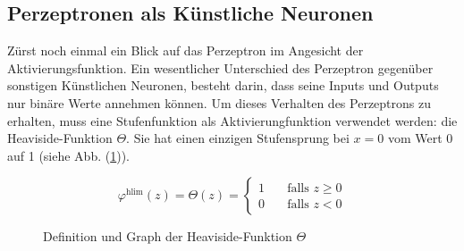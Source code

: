 \subsection{Perzeptronen als Künstliche Neuronen}
Zürst noch einmal ein Blick auf das Perzeptron im Angesicht der Aktivierungsfunktion.
Ein wesentlicher Unterschied des Perzeptron gegenüber sonstigen Künstlichen
Neuronen, besteht darin, dass seine Inputs und Outputs nur binäre Werte
annehmen können. Um dieses Verhalten des Perzeptrons zu erhalten,
muss eine Stufenfunktion als Aktivierungfunktion verwendet werden: die Heaviside-Funktion $\Theta$.
Sie hat einen einzigen Stufensprung bei $x=0$ vom Wert 0 auf 1 (siehe Abb. (\ref{fig:heaviside})).
\\
\begin{figure}[h!]
  \begin{minipage}[h!]{0.5\textwidth}
    \begin{equation*}
      \varphi^{\text{hlim}}(z) = \Theta(z) =
      \begin{cases}
        1 & \quad \text{falls } z \geq 0\\
        0 & \quad \text{falls } z < 0
      \end{cases}
    \end{equation*}
  \end{minipage}
  \begin{minipage}[h!]{0.5\textwidth}
    \centering
  \end{minipage}
  \caption{Definition und Graph der Heaviside-Funktion $\Theta$}
  \label{fig:heaviside}
\end{figure}

